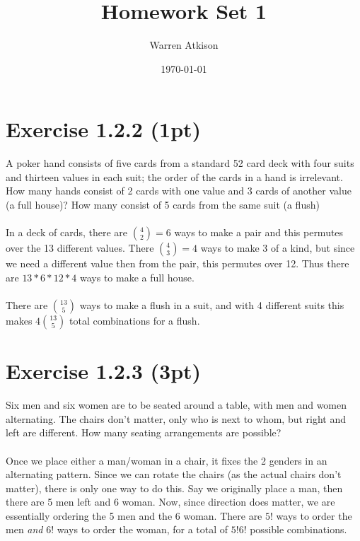 \documentclass{article}
\title{Homework Set 1}
\author{Warren Atkison}
\date{\today}
\begin{document}
\maketitle
\section*{Exercise 1.2.2 (1pt)}
A poker hand consists of five cards from a standard 52 card deck with four suits and thirteen values in each suit; the order of the cards in a hand is irrelevant. How many hands consist of 2 cards with one value and 3 cards of another value (a full house)? How many consist of 5 cards from the same suit (a flush)
\paragraph*{}
In a deck of cards, there are $\binom{4}{2} = 6$ ways to make a pair and this permutes over the 13 different values. There $\binom{4}{3} = 4$ ways to make 3 of a kind, but since we need a different value then from the pair, this permutes over 12. Thus there are $13*6*12*4$ ways to make a full house.
\paragraph*{}
There are $\binom{13}{5}$ ways to make a flush in a suit, and with 4 different suits this makes $4\binom{13}{5}$ total combinations for a flush.

\section*{Exercise 1.2.3 (3pt)}
Six men and six women are to be seated around a table, with men and women alternating. The chairs don't matter, only who is next to whom, but right and left are different. How many seating arrangements are possible?
\paragraph*{}
Once we place either a man/woman in a chair, it fixes the 2 genders in an alternating pattern. Since we can rotate the chairs (as the actual chairs don't matter), there is only one way to do this. Say we originally place a man, then there are 5 men left and 6 woman. Now, since direction does matter, we are essentially ordering the 5 men and the 6 woman. There are $5!$ ways to order the men \textit{and} $6!$ ways to order the woman, for a total of $5!6!$ possible combinations.
\end{document}

